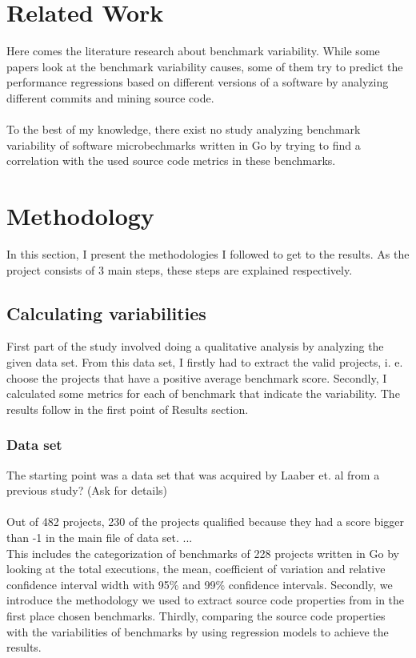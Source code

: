 \documentclass{seal_thesis}
\begin{document}
\chapter{Related Work}
Here comes the literature research about benchmark variability. While some papers look at the benchmark variability causes, some of them try to predict the performance regressions based on different versions of a software by analyzing different commits and mining source code. \\
\\
To the best of my knowledge, there exist no study analyzing benchmark variability of software microbechmarks written in Go by trying to find a correlation with the used source code metrics in these benchmarks.

\chapter{Methodology}
In this section, I present the methodologies I followed to get to the results. As the project consists of 3 main steps, these steps are explained respectively.
\section{Calculating variabilities}
First part of the study involved doing a qualitative analysis by analyzing the given data set. From this data set, I firstly had to extract the valid projects, i. e. choose the projects that have a positive average benchmark score. Secondly, I calculated some metrics for each of benchmark that indicate the variability. The results follow in the first point of Results section.
\subsection{Data set}
The starting point was a data set that was acquired by Laaber et. al from a previous study? (Ask for details) \\
\\
Out of 482 projects, 230 of the projects qualified because they had a score bigger than -1 in the main file of data set. ...
\\
 This includes the categorization of benchmarks of 228 projects written in Go by looking at the total executions, the mean, coefficient of variation and relative confidence interval width with 95\% and 99\% confidence intervals. Secondly, we introduce the methodology we used to extract source code properties from in the first place chosen benchmarks. Thirdly, comparing the source code properties with the variabilities of benchmarks by using regression models to achieve the results.
 
\end{document}
